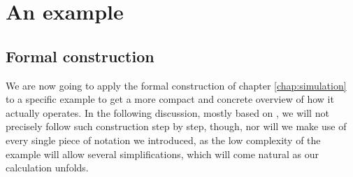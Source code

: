 \documentclass{book}
\theoremstyle{definition}
\theoremstyle{plain}
\theoremstyle{plain}
\theoremstyle{remark}
\theoremstyle{plain}
\begin{document}
	\chapter{An example}
	\section{Formal construction} \label{sec:mathex}
	We are now going to apply the formal construction of chapter \ref{chap:simulation} to a specific example to get a more compact and concrete overview of how it actually operates. In the following discussion, mostly based on \cite{slides}, we will not precisely follow such construction step by step, though, nor will we make use of every single piece of notation we introduced, as the low complexity of the example will allow several simplifications, which will come natural as our calculation unfolds.
	
\end{document}
